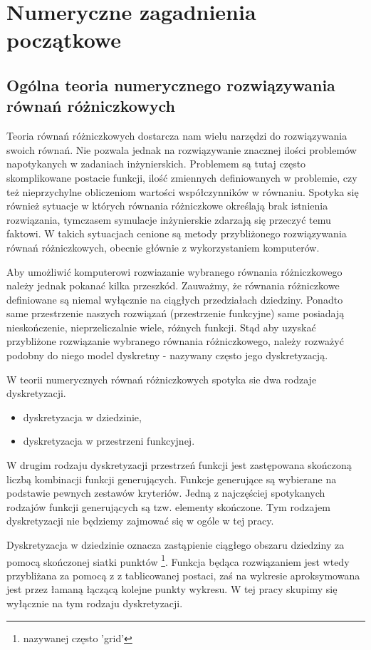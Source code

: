 \documentclass[12pt,a4paper]{report}
\begin{document}
\chapter{Numeryczne zagadnienia początkowe}

\section{Ogólna teoria numerycznego rozwiązywania równań różniczkowych}

Teoria równań różniczkowych dostarcza nam wielu narzędzi do rozwiązywania swoich równań. Nie pozwala jednak na rozwiązywanie znacznej ilości problemów napotykanych w zadaniach inżynierskich. Problemem są tutaj często skomplikowane postacie funkcji, ilość zmiennych definiowanych w problemie, czy też nieprzychylne obliczeniom wartości współczynników w równaniu. Spotyka się również sytuacje w których równania różniczkowe określają brak istnienia rozwiązania, tymczasem symulacje inżynierskie zdarzają się przeczyć temu faktowi. W takich sytuacjach cenione są metody przybliżonego rozwiązywania równań różniczkowych, obecnie głównie z wykorzystaniem komputerów. 

Aby umożliwić komputerowi rozwiazanie wybranego równania różniczkowego należy jednak pokanać kilka przeszkód. Zauważmy, że równania różniczkowe definiowane są niemal wyłącznie na ciągłych przedziałach dziedziny. Ponadto same przestrzenie naszych rozwiązań (przestrzenie funkcyjne) same posiadają nieskończenie, nieprzeliczalnie wiele, różnych funkcji. Stąd aby uzyskać przybliżone rozwiązanie wybranego równania różniczkowego, należy rozważyć podobny do niego model dyskretny - nazywany często jego dyskretyzacją. 

W teorii numerycznych równań różniczkowych spotyka sie dwa rodzaje dyskretyzacji.
\begin{itemize}
\item dyskretyzacja w dziedzinie,
\item dyskretyzacja w przestrzeni funkcyjnej.
\end{itemize}

W drugim rodzaju dyskretyzacji przestrzeń funkcji jest zastępowana skończoną liczbą kombinacji funkcji generujących. Funkcje generujące są wybierane na podstawie pewnych zestawów kryteriów. Jedną z najczęściej spotykanych rodzajów funkcji generujących są tzw. elementy skończone. Tym rodzajem dyskretyzacji nie będziemy zajmować się w ogóle w tej pracy.

Dyskretyzacja w dziedzinie oznacza zastąpienie ciągłego obszaru dziedziny za pomocą skończonej siatki punktów \footnote{nazywanej często 'grid'}. Funkcja będąca rozwiązaniem jest wtedy przybliżana za pomocą z z tablicowanej postaci, zaś na wykresie aproksymowana jest przez łamaną łączącą kolejne punkty wykresu. W tej pracy skupimy się wyłącznie na tym rodzaju dyskretyzacji. 
\end{document}
